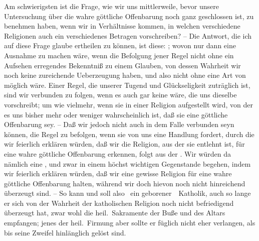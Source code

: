 \begin{aufza}
\item Am schwierigsten ist die Frage, wie wir uns mittlerweile, bevor unsere Untersuchung über die wahre göttliche Offenbarung noch ganz geschlossen ist, zu benehmen haben, wenn wir in Verhältnisse kommen, in welchen verschiedene Religionen auch ein verschiedenes Betragen vorschreiben? -- Die  Antwort, die ich auf diese Frage glaube ertheilen zu können, ist diese: ; wovon nur dann eine Ausnahme zu machen wäre, wenn die Befolgung jener Regel nicht ohne ein Aufsehen erregendes Bekenntniß zu einem Glauben, von dessen Wahrheit wir noch keine zureichende Ueberzeugung haben, und also nicht ohne eine Art von  möglich wäre. Einer Regel, die unserer Tugend und Glückseligkeit zuträglich ist, sind wir verbunden zu folgen, wenn es auch gar keine  wäre, die uns dieselbe vorschreibt; um wie vielmehr, wenn sie in einer Religion aufgestellt wird, von der es uns bisher mehr oder weniger wahrscheinlich ist, daß sie eine göttliche Offenbarung sey. -- Daß wir jedoch nicht auch in dem Falle verbunden seyn können, die Regel zu befolgen, wenn sie von uns eine Handlung fordert, durch die wir feierlich erklären würden, daß wir die Religion, aus der sie entlehnt ist, für eine wahre göttliche Offenbarung erkennen, folgt aus der . Wir würden da nämlich eine , und zwar in einem höchst wichtigen Gegenstande begehen, indem wir feierlich erklären würden, daß wir eine gewisse Religion für eine wahre göttliche Offenbarung halten, während wir doch hievon noch nicht hinreichend überzeugt sind. -- So kann und soll also \zB\ ein geborener~\ Katholik, auch so lange er sich von der Wahrheit der katholischen Religion noch nicht befriedigend überzeugt hat, zwar wohl die heil.\ Sakramente der Buße und des Altars empfangen; jenes der heil.\ Firmung aber sollte er füglich nicht eher verlangen, als bis seine Zweifel hinlänglich gelöst sind.

\end{aufza}
